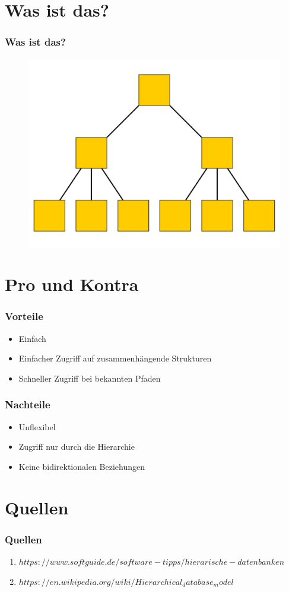 \documentclass[hyperref={pdfpagelabels=false}]{beamer}
\begin{document}
\begin{frame}
\titlepage
\end{frame} 

\section{Was ist das?} 
\begin{frame}
\frametitle {Was ist das?}
\begin{figure}
\includegraphics[scale=.2]{HD.png}
\centering
\end{figure}
\end{frame}

\section{Pro und Kontra} 
\begin{frame}
\frametitle{Vorteile}
\begin{itemize}
\item<1-> Einfach
\item<2-> Einfacher Zugriff auf zusammenhängende Strukturen
\item<3-> Schneller Zugriff bei bekannten Pfaden
\end{itemize}
\end{frame}
\begin{frame}
\frametitle{Nachteile}
\begin{itemize}
\item<1-> Unflexibel
\item<2-> Zugriff nur durch die Hierarchie
\item<3-> Keine bidirektionalen Beziehungen 
\end{itemize}
\end{frame}
\section{Quellen}
\begin{frame}
\frametitle{Quellen}
\begin{enumerate} 
\item $https://www.softguide.de/software-tipps/hierarische-datenbanken$
\item $https://en.wikipedia.org/wiki/Hierarchical_database_model$
\end{enumerate}
\end{frame}
\end{document}
